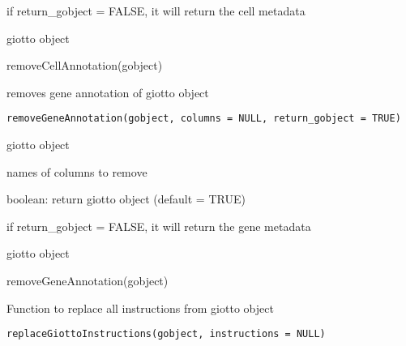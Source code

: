 \documentclass[a4paper]{book}
\begin{document}
%
\begin{Details}\relax
if return\_gobject = FALSE, it will return the cell metadata
\end{Details}
%
\begin{Value}
giotto object
\end{Value}
%
\begin{Examples}
\begin{ExampleCode}
    removeCellAnnotation(gobject)
\end{ExampleCode}
\end{Examples}
%
\begin{Description}\relax
removes gene annotation of giotto object
\end{Description}
%
\begin{Usage}
\begin{verbatim}
removeGeneAnnotation(gobject, columns = NULL, return_gobject = TRUE)
\end{verbatim}
\end{Usage}
%
\begin{Arguments}
\begin{ldescription}
\item[\code{gobject}] giotto object

\item[\code{columns}] names of columns to remove

\item[\code{return\_gobject}] boolean: return giotto object (default = TRUE)
\end{ldescription}
\end{Arguments}
%
\begin{Details}\relax
if return\_gobject = FALSE, it will return the gene metadata
\end{Details}
%
\begin{Value}
giotto object
\end{Value}
%
\begin{Examples}
\begin{ExampleCode}
    removeGeneAnnotation(gobject)
\end{ExampleCode}
\end{Examples}
%
\begin{Description}\relax
Function to replace all instructions from giotto object
\end{Description}
%
\begin{Usage}
\begin{verbatim}
replaceGiottoInstructions(gobject, instructions = NULL)
\end{verbatim}
\end{Usage}
\end{document}
